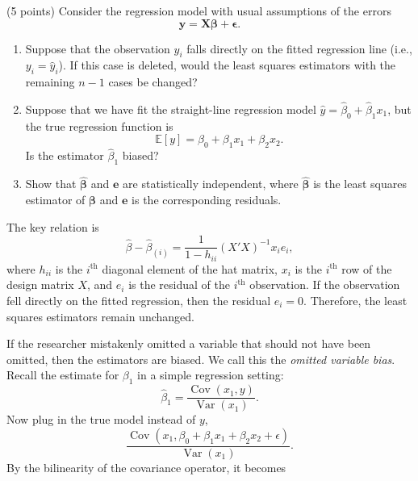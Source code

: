 \documentclass[answers]{exam}
\newcommand{\bs}{\boldsymbol}
\newcommand{\opn}{\operatorname}
\begin{document}
\newpage
{}
\begin{questions}
   \question
   (5 points) Consider the regression model with usual assumptions of the errors
   $$
   \bs{y} = \bs{X\beta} + \bs{\epsilon}.
   $$
   \begin{enumerate}[label=(\alph*)]
   \item Suppose that the observation $y_{i}$ falls directly on the fitted regression line (i.e., $y_{i}=\hat{y}_{i}$). If this case is deleted, would the least squares estimators with the remaining $n-1$ cases be changed? 
   \item Suppose that we have fit the straight-line regression model $\hat{y}=\hat{\beta}_{0}+\hat{\beta}_{1}x_{1}$, but the true regression function is
   $$
      \mathbb{E}\left[y\right] = \beta_{0} + \beta_{1}x_{1} + \beta_{2}x_{2}.
   $$
   Is the estimator $\hat{\beta}_{1}$ biased?
   \item Show that $\hat{\bs{\beta}}$ and $\bs{e}$ are statistically independent, where $\hat{\bs{\beta}}$ is the least squares estimator of $\bs{\beta}$ and $\bs{e}$ is the corresponding residuals.
   \end{enumerate}
   \begin{solution}
   The key relation is
   $$
   \hat{\beta} - \hat{\beta}_{\left(i\right)} = \frac{1}{1-h_{ii}}\left(X'X\right)^{-1}x_{i}e_{i},
   $$
   where $h_{ii}$ is the $i^{\text{th}}$ diagonal element of the hat matrix, $x_{i}$ is the $i^{\text{th}}$ row of the design matrix $X$, and $e_{i}$ is the residual of the $i^{\text{th}}$ observation. If the observation fell directly on the fitted regression, then the residual $e_{i} = 0$. Therefore, the least squares estimators remain unchanged.
   \end{solution}
   \begin{solution}
   If the researcher mistakenly omitted a variable that should not have been omitted, then the estimators are biased. We call this the \emph{omitted variable bias}. Recall the estimate for $\beta_{1}$ in a simple regression setting:
   $$
   \hat{\beta}_{1} = \frac{\opn{Cov}\left(x_{1},y\right)}{\opn{Var}\left(x_{1}\right)}.
   $$
   Now plug in the true model instead of $y$,
   $$
      \frac{\opn{Cov}\left(x_{1},\beta_{0}+\beta_{1}x_{1}+\beta_{2}x_{2}+\epsilon \right)}{\opn{Var}\left(x_{1}\right)}.
   $$
   By the bilinearity of the covariance operator, it becomes

\end{solution}
\end{questions}
\end{document}
